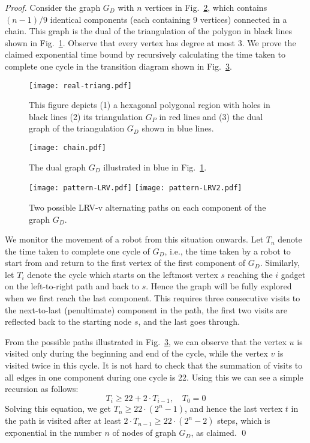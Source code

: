 \begin{proof}
Consider the graph $G_D$ with $n$ vertices in Fig.~\ref{GD-LRV}, which contains
$(n-1)/9$ identical components (each containing 9 vertices) connected in a chain.
This graph is the dual of the triangulation of the polygon in black lines shown in Fig.~\ref{triang-LRV}.
Observe that every vertex has degree at most 3.
We prove the claimed exponential time bound by recursively calculating the time taken to complete one cycle in the transition
diagram shown in Fig.~\ref{LRV}.

\begin{figure}[t]\centering
\texttt{[image: real-triang.pdf]}
\caption{This figure depicts (1) a hexagonal polygonal region with holes in black lines (2) its triangulation $G_P$ in red lines
and (3) the dual graph of the triangulation $G_D$ shown in blue lines.} \label{triang-LRV}
 \end{figure}

\begin{figure}[h]\centering
\texttt{[image: chain.pdf]}
\caption{The dual graph $G_D$ illustrated in blue in Fig.~\ref{triang-LRV}.} \label{GD-LRV}
 \end{figure}


\begin{figure}[h]\centering
\texttt{[image: pattern-LRV.pdf]}
\texttt{[image: pattern-LRV2.pdf]}
\caption{Two possible LRV-v alternating paths on each component of the graph $G_D$.} \label{LRV}
 \end{figure}

We monitor the movement of a robot from this situation onwards.
Let $T_n$ denote the time taken to
complete one cycle of $G_D$, i.e., the time taken by a robot to start
from and return to the first vertex of the first component of $G_D$. Similarly,
let $T_i$ denote the cycle which starts on the leftmost vertex $s$ reaching the $i$ gadget on the left-to-right path
and back to $s$.
Hence the graph will be fully explored when we first reach the last component.
This requires three consecutive visits to the next-to-last (penultimate) component in the path, the first
two visits are reflected back to the starting node $s$, and the last goes through.


From the possible paths illustrated in Fig.~\ref{LRV}, we can observe that the vertex $u$ is visited only during the beginning and
end of the cycle, while the vertex $v$ is visited twice in this cycle. It is not hard to check that the summation of visits to all edges
in one component during one cycle is 22. Using this we can see a simple recursion as follows:
$$T_i \geq 22 + 2 \cdot T_{i-1},\quad T_0 = 0$$
Solving this equation, we get $T_{n} \geq 22 \cdot (2^{n}-1)$, and hence the last vertex $t$ in the path is visited
after at least $2\cdot T_{n-1}\geq 22 \cdot (2^{n}-2)$ steps, which is exponential in the number $n$ of nodes of graph $G_D$, as claimed.
\qed
\end{proof}

